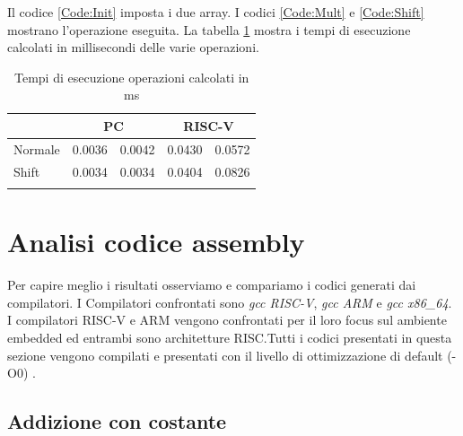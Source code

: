 \documentclass[12pt, a4paper]{report}
\begin{document}




Il codice \ref{Code:Init} imposta i due array. I codici \ref{Code:Mult} e \ref{Code:Shift} mostrano l'operazione eseguita.
La tabella \ref{Tab:tempi_esecuzioneMS} mostra i tempi di esecuzione calcolati in millisecondi delle varie operazioni.

\begin{table}[ht]
\centering
\begin{tabular}{lcccc}
\cline{2-5}
\multicolumn{1}{l|}{} & \multicolumn{2}{c|}{PC} & \multicolumn{2}{c|}{RISC-V} \\ \hline
\multicolumn{1}{|l|}{Normale} & \multicolumn{1}{c|}{0.0036} & \multicolumn{1}{c|}{0.0042} & \multicolumn{1}{c|}{0.0430} & \multicolumn{1}{c|}{0.0572} \\ \hline
\multicolumn{1}{|l|}{Shift} & \multicolumn{1}{c|}{0.0034} & \multicolumn{1}{c|}{0.0034} & \multicolumn{1}{c|}{0.0404} & \multicolumn{1}{c|}{0.0826} \\ \hline
 & \multicolumn{1}{l}{} & \multicolumn{1}{l}{} & \multicolumn{1}{l}{} & \multicolumn{1}{l}{} 
\end{tabular}
	\caption{Tempi di esecuzione operazioni calcolati in ms}
	\label{Tab:tempi_esecuzioneMS}
\end{table}
	
	
\section{Analisi codice assembly}
Per capire meglio i risultati osserviamo e compariamo i codici generati dai compilatori. I Compilatori confrontati sono \textit{gcc RISC-V}, \textit{gcc ARM} e \textit{gcc x86\_64}. I compilatori RISC-V e ARM vengono confrontati per il loro focus sul ambiente embedded ed entrambi sono architetture RISC.Tutti i codici presentati in questa sezione vengono compilati e presentati con il livello di ottimizzazione di default (-O0) \cite{ConfrontoISABook}.


\subsection{Addizione con costante}
\end{document}
